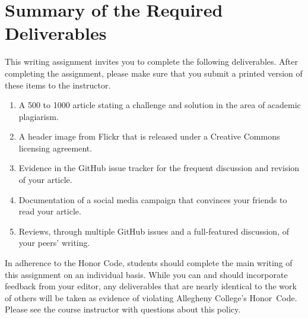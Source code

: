 \vspace*{-.15in}
\section*{Summary of the Required Deliverables}

This writing assignment invites you to complete the following deliverables. After completing the assignment, please make
sure that you submit a printed version of these items to the instructor.

\vspace*{-.1in}
\begin{enumerate}
  \setlength{\itemsep}{-.01in}

  \item A 500 to 1000 article stating a challenge and solution in the area of academic plagiarism.
  \item A header image from Flickr that is released under a Creative Commons licensing agreement.
  \item Evidence in the GitHub issue tracker for the frequent discussion and revision of your article.
  \item Documentation of a social media campaign that convinces your friends to read your article.
  \item Reviews, through multiple GitHub issues and a full-featured discussion, of your peers' writing.

\end{enumerate}
\vspace*{-.1in}

In adherence to the Honor Code, students should complete the main writing of this assignment on an individual basis.
While you can and should incorporate feedback from your editor, any deliverables that are nearly identical to the work
of others will be taken as evidence of violating Allegheny College's \mbox{Honor Code}. Please see the course instructor
with questions about this policy.


